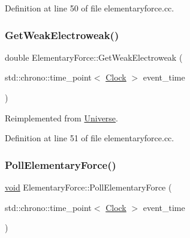 Definition at line 50 of file elementaryforce.\+cc.

\mbox{\label{class_elementary_force_a928e06a1fa81b8d7ec4a426d959a0f98}} 
\subsubsection{\texorpdfstring{Get\+Weak\+Electroweak()}{GetWeakElectroweak()}}
{\footnotesize\ttfamily double Elementary\+Force\+::\+Get\+Weak\+Electroweak (\begin{DoxyParamCaption}\item[{std\+::chrono\+::time\+\_\+point$<$ \mbox{\hyperlink{universe_8h_a0ef8d951d1ca5ab3cfaf7ab4c7a6fd80}{Clock}} $>$}]{event\+\_\+time }\end{DoxyParamCaption})\hspace{0.3cm}{\ttfamily [virtual]}}



Reimplemented from \mbox{\hyperlink{class_universe_a645299738e6b798a037f2a15a2e7cf4d}{Universe}}.



Definition at line 51 of file elementaryforce.\+cc.

\mbox{\label{class_elementary_force_aa5ab479744dbf3e8578f8d2974299ff7}} 
\subsubsection{\texorpdfstring{Poll\+Elementary\+Force()}{PollElementaryForce()}}
{\footnotesize\ttfamily \mbox{\hyperlink{glad_8h_a950fc91edb4504f62f1c577bf4727c29}{void}} Elementary\+Force\+::\+Poll\+Elementary\+Force (\begin{DoxyParamCaption}\item[{std\+::chrono\+::time\+\_\+point$<$ \mbox{\hyperlink{universe_8h_a0ef8d951d1ca5ab3cfaf7ab4c7a6fd80}{Clock}} $>$}]{event\+\_\+time }\end{DoxyParamCaption})\hspace{0.3cm}{\ttfamily [virtual]}}




